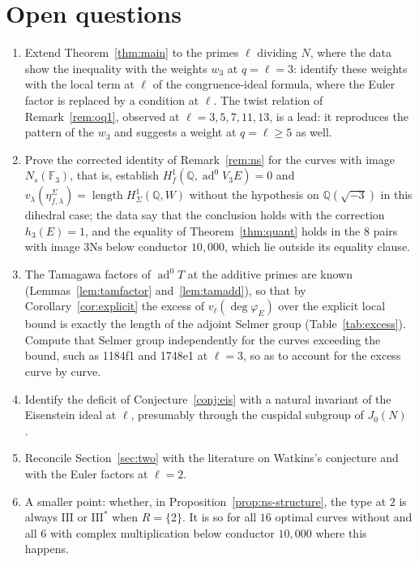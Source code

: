 \documentclass[11pt]{amsart}
\theoremstyle{definition}
\newcommand{\Q}{\mathbb{Q}}
\newcommand{\F}{\mathbb{F}}
\newcommand{\degphi}{\deg\varphi_E}
\newcommand{\ad}{\operatorname{ad}^0}
\newcommand{\len}{\operatorname{length}}
\newcommand{\Ns}{3\mathrm{Ns}}
\begin{document}
\section{Open questions}\label{sec:open}
\begin{enumerate}
\item Extend Theorem~\ref{thm:main} to the primes $\ell$ dividing $N$, where the data show the inequality with the weights $w_3$ at $q=\ell=3$: identify these weights with the local term at $\ell$ of the congruence-ideal formula, where the Euler factor is replaced by a condition at $\ell$. The twist relation of Remark~\ref{rem:oq1}, observed at $\ell=3,5,7,11,13$, is a lead: it reproduces the pattern of the $w_3$ and suggests a weight at $q=\ell\ge5$ as well.
\item Prove the corrected identity of Remark~\ref{rem:ns} for the curves with image $N_s(\F_3)$, that is, establish $H^1_f(\Q,\ad V_3E)=0$ and $v_\lambda(\eta^\Sigma_{f,\lambda})=\len H^1_\Sigma(\Q,W)$ without the hypothesis on $\Q(\sqrt{-3})$ in this dihedral case; the data say that the conclusion holds with the correction $h_3(E)=1$, and the equality of Theorem~\ref{thm:quant} holds in the $8$ pairs with image $\Ns$ below conductor $10{,}000$, which lie outside its equality clause.
\item The Tamagawa factors of $\ad T$ at the additive primes are known (Lemmas~\ref{lem:tamfactor} and~\ref{lem:tamadd}), so that by Corollary~\ref{cor:explicit} the excess of $v_\ell(\degphi)$ over the explicit local bound is exactly the length of the adjoint Selmer group (Table~\ref{tab:excess}). Compute that Selmer group independently for the curves exceeding the bound, such as 1184f1 and 1748e1 at $\ell=3$, so as to account for the excess curve by curve.
\item Identify the deficit of Conjecture~\ref{conj:eis} with a natural invariant of the Eisenstein ideal at $\ell$, presumably through the cuspidal subgroup of $J_0(N)$ \cite{Mazur77}.
\item Reconcile Section~\ref{sec:two} with the literature on Watkins's conjecture and with the Euler factors at $\ell=2$.
\item A smaller point: whether, in Proposition~\ref{prop:ns-structure}, the type at $2$ is always $\mathrm{III}$ or $\mathrm{III}^*$ when $R=\{2\}$. It is so for all $16$ optimal curves without and all $6$ with complex multiplication below conductor $10{,}000$ where this happens.
\end{enumerate}
\end{document}
